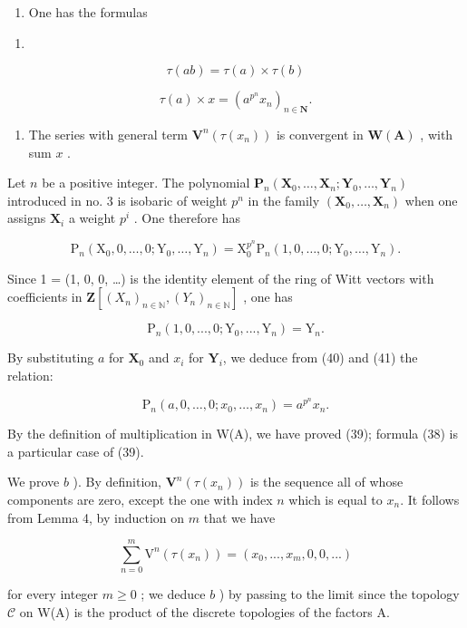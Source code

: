 \begin{enumerate}
\def\labelenumi{\alph{enumi})}
\tightlist
\item
  One has the formulas
\end{enumerate}

\begin{enumerate}
\def\labelenumi{(\arabic{enumi})}
\setcounter{enumi}{37}
\tightlist
\item
\end{enumerate}

\[
\tau (a b) = \tau (a) \times \tau (b)\tag{39}
\]

\[
\tau (a) \times x = (a ^ {p ^ {n}} x _ {n}) _ {n \in \mathbf {N}}.
\]

\begin{enumerate}
\def\labelenumi{\alph{enumi})}
\setcounter{enumi}{1}
\tightlist
\item
  The series with general term \(\mathbf{V}^{n}(\tau(x_{n}))\) is convergent in \(\mathbf{W}(\mathbf{A})\) , with sum \(x\) .
\end{enumerate}

Let \(n\) be a positive integer. The polynomial \(\mathbf{P}_{n}(\mathbf{X}_{0},\ldots,\mathbf{X}_{n};\mathbf{Y}_{0},\ldots,\mathbf{Y}_{n})\) introduced in no. 3 is isobaric of weight \(p^{n}\) in the family \((\mathbf{X}_{0},\ldots,\mathbf{X}_{n})\) when one assigns \(\mathbf{X}_{i}\) a weight \(p^{i}\) . One therefore has

\[
\mathrm{P} _ {n} \left(\mathrm{X} _ {0}, 0, \dots , 0; \mathrm{Y} _ {0}, \dots , \mathrm{Y} _ {n}\right) = \mathrm{X} _ {0} ^ {p ^ {n}} \mathrm{P} _ {n} (1, 0, \dots , 0; \mathrm{Y} _ {0}, \dots , \mathrm{Y} _ {n}).\tag{40}
\]

Since 1 = (1, 0, 0, \ldots) is the identity element of the ring of Witt vectors with coefficients in \(\mathbf{Z}[(X_n)_{n\in\mathbb{N}}, (Y_n)_{n\in\mathbb{N}}]\) , one has

\[
\mathrm{P} _ {n} (1, 0,..., 0; \mathrm{Y} _ {0},..., \mathrm{Y} _ {n}) = \mathrm{Y} _ {n}.\tag{41}
\]

By substituting \(a\) for \(\mathbf{X}_{0}\) and \(x_{i}\) for \(\mathbf{Y}_{i}\), we deduce from (40) and (41) the relation:

\[
\mathrm{P} _ {n} (a, 0, \dots , 0; x _ {0}, \dots , x _ {n}) = a ^ {p ^ {n}} x _ {n}.
\]

By the definition of multiplication in W(A), we have proved (39); formula (38) is a particular case of (39).

We prove \(b\) ). By definition, \(\mathbf{V}^{n}(\tau(x_{n}))\) is the sequence all of whose components are zero, except the one with index \(n\) which is equal to \(x_{n}\). It follows from Lemma 4, by induction on \(m\) that we have

\[
\sum_ {n = 0} ^ {m} \mathrm{V} ^ {n} (\tau (x _ {n})) = (x _ {0},..., x _ {m}, 0, 0,...)
\]

for every integer \(m \geqslant 0\) ; we deduce \(b\) ) by passing to the limit since the topology \(\mathcal{C}\) on W(A) is the product of the discrete topologies of the factors A.

